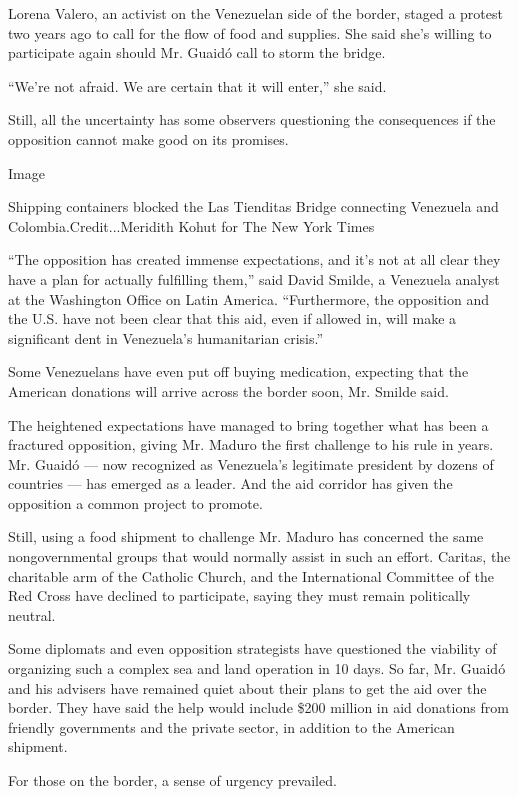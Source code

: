 Lorena Valero, an activist on the Venezuelan side of the border, staged
a protest two years ago to call for the flow of food and supplies. She
said she's willing to participate again should Mr. Guaidó call to storm
the bridge.

``We're not afraid. We are certain that it will enter,'' she said.

Still, all the uncertainty has some observers questioning the
consequences if the opposition cannot make good on its promises.

Image

Shipping containers blocked the Las Tienditas Bridge connecting
Venezuela and Colombia.Credit...Meridith Kohut for The New York Times

``The opposition has created immense expectations, and it's not at all
clear they have a plan for actually fulfilling them,'' said David
Smilde, a Venezuela analyst at the Washington Office on Latin America.
``Furthermore, the opposition and the U.S. have not been clear that this
aid, even if allowed in, will make a significant dent in Venezuela's
humanitarian crisis.''

Some Venezuelans have even put off buying medication, expecting that the
American donations will arrive across the border soon, Mr. Smilde said.

The heightened expectations have managed to bring together what has been
a fractured opposition, giving Mr. Maduro the first challenge to his
rule in years. Mr. Guaidó --- now recognized as Venezuela's legitimate
president by dozens of countries --- has emerged as a leader. And the
aid corridor has given the opposition a common project to promote.

Still, using a food shipment to challenge Mr. Maduro has concerned the
same nongovernmental groups that would normally assist in such an
effort. Caritas, the charitable arm of the Catholic Church, and the
International Committee of the Red Cross have declined to participate,
saying they must remain politically neutral.

Some diplomats and even opposition strategists have questioned the
viability of organizing such a complex sea and land operation in 10
days. So far, Mr. Guaidó and his advisers have remained quiet about
their plans to get the aid over the border. They have said the help
would include \$200 million in aid donations from friendly governments
and the private sector, in addition to the American shipment.

For those on the border, a sense of urgency prevailed.

